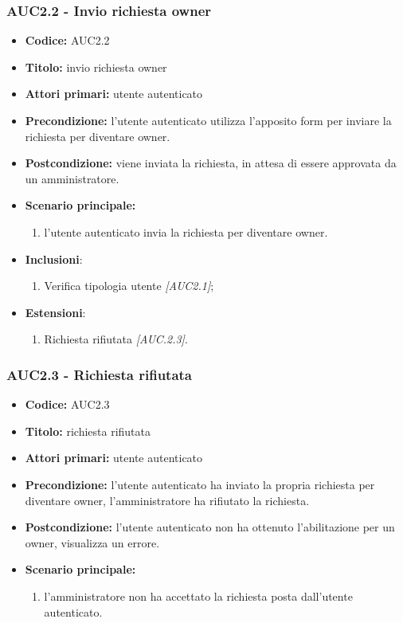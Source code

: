 \documentclass[casi-duso]{subfiles}
\begin{document}
\subsubsection{AUC2.2 - Invio richiesta owner}%
\label{subsub:AUC2.2}
\begin{itemize}
  \item \textbf{Codice:} AUC2.2
  \item \textbf{Titolo:} invio richiesta owner
  \item \textbf{Attori primari:} utente autenticato
  \item \textbf{Precondizione:} l'utente autenticato utilizza l'apposito form per inviare la richiesta per diventare owner.
  \item \textbf{Postcondizione:} viene inviata la richiesta, in attesa di essere approvata da un amministratore.
  \item \textbf{Scenario principale:}
  \begin{enumerate}
    \item l'utente autenticato invia la richiesta per diventare owner.
  \end{enumerate}
  \item \textbf{Inclusioni}:
  \begin{enumerate}
    \item Verifica tipologia utente \emph{[AUC2.1]};
  \end{enumerate}
  \item \textbf{Estensioni}:
  \begin{enumerate}
    \item Richiesta rifiutata \emph{[AUC.2.3]}.
  \end{enumerate}
\end{itemize}

\subsubsection{AUC2.3 - Richiesta rifiutata}%
\label{subsub:AUC2.3}
\begin{itemize}
  \item \textbf{Codice:} AUC2.3
  \item \textbf{Titolo:} richiesta rifiutata
  \item \textbf{Attori primari:} utente autenticato
  \item \textbf{Precondizione:} l'utente autenticato ha inviato la propria richiesta per diventare owner, l'amministratore ha rifiutato la richiesta.
  \item \textbf{Postcondizione:} l'utente autenticato non ha ottenuto l'abilitazione per un owner, visualizza un errore.
  \item \textbf{Scenario principale:}
  \begin{enumerate}
    \item l'amministratore non ha accettato la richiesta posta dall'utente autenticato.
  \end{enumerate}
\end{itemize}
\end{document}
